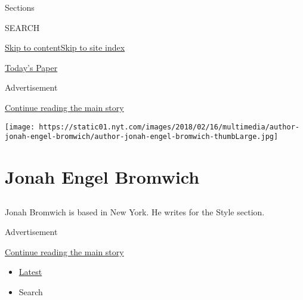 Sections

SEARCH

\protect\hyperlink{site-content}{Skip to
content}\protect\hyperlink{site-index}{Skip to site index}

\href{https://myaccount.nytimes.com/auth/login?response_type=cookie\&client_id=vi}{}

\href{https://www.nytimes.com/section/todayspaper}{Today's Paper}

Advertisement

\protect\hyperlink{after-top}{Continue reading the main story}

\texttt{[image: https://static01.nyt.com/images/2018/02/16/multimedia/author-jonah-engel-bromwich/author-jonah-engel-bromwich-thumbLarge.jpg]}

\hypertarget{jonah-engel-bromwich}{%
\section{Jonah Engel Bromwich}\label{jonah-engel-bromwich}}

\subsection{}

Jonah Bromwich is based in New York. He writes for the Style section.

Advertisement

\protect\hyperlink{after-mid1}{Continue reading the main story}

\begin{itemize}
\tightlist
\item
  \protect\hyperlink{stream-panel}{Latest}
\item
  Search
\end{itemize}

